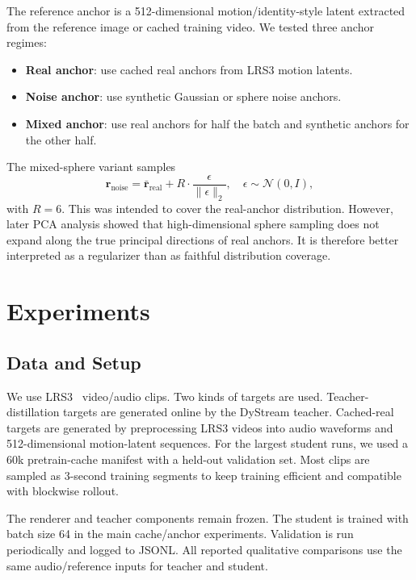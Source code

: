 \documentclass{article}
\begin{document}
The reference anchor is a 512-dimensional motion/identity-style latent extracted from the reference image or cached training video. We tested three anchor regimes:
\begin{itemize}
    \item \textbf{Real anchor}: use cached real anchors from LRS3 motion latents.
    \item \textbf{Noise anchor}: use synthetic Gaussian or sphere noise anchors.
    \item \textbf{Mixed anchor}: use real anchors for half the batch and synthetic anchors for the other half.
\end{itemize}
The mixed-sphere variant samples
\begin{equation}
    \mathbf{r}_{\text{noise}} =
    \bar{\mathbf{r}}_{\text{real}}
    +
    R \cdot
    \frac{\epsilon}{\|\epsilon\|_2},
    \quad \epsilon \sim \mathcal{N}(0,I),
\end{equation}
with $R=6$. This was intended to cover the real-anchor distribution. However, later PCA analysis showed that high-dimensional sphere sampling does not expand along the true principal directions of real anchors. It is therefore better interpreted as a regularizer than as faithful distribution coverage.

\section{Experiments}

\subsection{Data and Setup}

We use LRS3~\cite{lrs3} video/audio clips. Two kinds of targets are used. Teacher-distillation targets are generated online by the DyStream teacher. Cached-real targets are generated by preprocessing LRS3 videos into audio waveforms and 512-dimensional motion-latent sequences. For the largest student runs, we used a 60k pretrain-cache manifest with a held-out validation set. Most clips are sampled as 3-second training segments to keep training efficient and compatible with blockwise rollout.

The renderer and teacher components remain frozen. The student is trained with batch size 64 in the main cache/anchor experiments. Validation is run periodically and logged to JSONL. All reported qualitative comparisons use the same audio/reference inputs for teacher and student.
\end{document}
